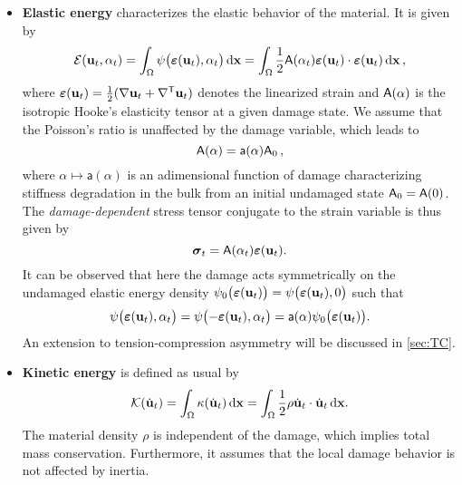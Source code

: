 \begin{itemize}
\item \textbf{Elastic energy} characterizes the elastic behavior of the material. It is given by
\begin{equation} \label{eq:elasticG}
\mathcal{E}(\vec{u}_t,\alpha_t)=\int_\Omega\psi\bigl(\eps(\vec{u}_t),\alpha_t\bigr)\dx=\int_\Omega\frac{1}{2}\tens{A}(\alpha_t)\eps(\vec{u}_t)\cdot\eps(\vec{u}_t)\dx\,,
\end{equation}
where $\eps(\vec{u}_t)=\frac{1}{2}(\nabla\vec{u}_t+\nabla^\mT\vec{u}_t)$ denotes the linearized strain and $\mathsf{A}(\alpha)$ is the isotropic Hooke's elasticity tensor at a given damage state. We assume that the Poisson's ratio is unaffected by the damage variable, which leads to
\[
\mathsf{A}(\alpha)=\mathsf{a}(\alpha)\mathsf{A}_0\,,
\]
where $\alpha\mapsto\mathsf{a}(\alpha)$ is an adimensional function of damage characterizing stiffness degradation in the bulk from an initial undamaged state $\mathsf{A}_0=\mathsf{A}(0)$. The \emph{damage-dependent} stress tensor conjugate to the strain variable is thus given by
\begin{equation} \label{eq:stress}
\sig_t=\tens{A}(\alpha_t)\eps(\vec{u}_t).
\end{equation}
It can be observed that here the damage acts symmetrically on the undamaged elastic energy density $\psi_0\bigl(\eps(\vec{u}_t)\bigr)=\psi\bigl(\eps(\vec{u}_t),0\bigr)$ such that
\begin{equation} \label{eq:psi0}
\psi\bigl(\eps(\vec{u}_t),\alpha_t\bigr)=\psi\bigl(-\eps(\vec{u}_t),\alpha_t\bigr)=\mathsf{a}(\alpha)\psi_0\bigl(\eps(\vec{u}_t)\bigr).
\end{equation}
An extension to tension-compression asymmetry will be discussed in \cref{sec:TC}.

\item \textbf{Kinetic energy} is defined as usual by
\begin{equation} \label{eq:kineticG}
\mathcal{K}(\dot{\vec{u}}_t)=\int_\Omega\kappa(\dot{\vec{u}}_t)\dx=\int_\Omega\frac{1}{2}\rho\dot{\vec{u}}_t\cdot\dot{\vec{u}}_t\dx.
\end{equation}
The material density $\rho$ is independent of the damage, which implies total mass conservation. Furthermore, it assumes that the local damage behavior is not affected by inertia.


\end{itemize}
